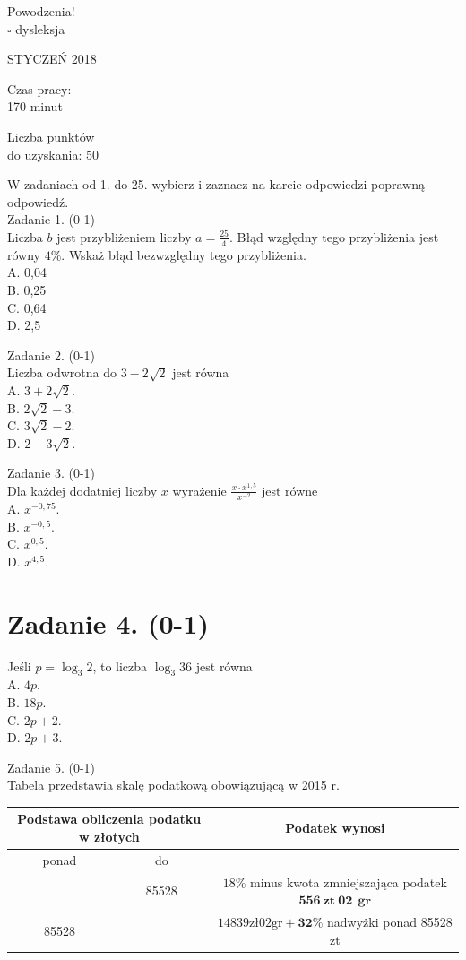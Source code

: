 \documentclass[10pt]{article}
\begin{document}
Powodzenia!\\
\(\square\) dysleksja

STYCZEŃ 2018

Czas pracy:\\
170 minut

Liczba punktów\\
do uzyskania: 50

W zadaniach od 1. do 25. wybierz i zaznacz na karcie odpowiedzi poprawną odpowiedź.\\
Zadanie 1. (0-1)\\
Liczba \(b\) jest przybliżeniem liczby \(a=\frac{25}{4}\). Błąd względny tego przybliżenia jest równy \(4 \%\). Wskaż błąd bezwzględny tego przybliżenia.\\
A. 0,04\\
B. 0,25\\
C. 0,64\\
D. 2,5

Zadanie 2. (0-1)\\
Liczba odwrotna do \(3-2 \sqrt{2}\) jest równa\\
A. \(3+2 \sqrt{2}\).\\
B. \(2 \sqrt{2}-3\).\\
C. \(3 \sqrt{2}-2\).\\
D. \(2-3 \sqrt{2}\).

Zadanie 3. (0-1)\\
Dla każdej dodatniej liczby \(x\) wyrażenie \(\frac{x \cdot x^{1,5}}{x^{-2}}\) jest równe\\
A. \(x^{-0,75}\).\\
B. \(x^{-0,5}\).\\
C. \(x^{0,5}\).\\
D. \(x^{4,5}\).

\section*{Zadanie 4. (0-1)}
Jeśli \(p=\log _{3} 2\), to liczba \(\log _{3} 36\) jest równa\\
A. \(4 p\).\\
B. \(18 p\).\\
C. \(2 p+2\).\\
D. \(2 p+3\).

Zadanie 5. (0-1)\\
Tabela przedstawia skalę podatkową obowiązującą w 2015 r.

\begin{center}
\begin{tabular}{|c|c|c|}
\hline
\multicolumn{2}{|c|}{Podstawa obliczenia podatku w złotych} & Podatek wynosi \\
\hline
ponad & do &  \\
\hline
 & 85528 & \(18 \%\) minus kwota zmniejszająca podatek \(\mathbf{5 5 6} \mathbf{~ z t ~ 0 2 ~} \mathbf{~ g r}\) \\
\hline
85528 &  & \(14839 \mathrm{zł} 02 \mathrm{gr}+\mathbf{3 2 \%}\) nadwyżki ponad 85528 zt \\
\hline
\end{tabular}
\end{center}
\end{document}
